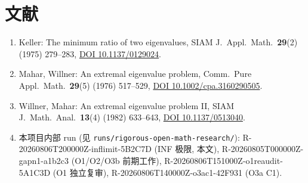 \documentclass[UTF8]{ctexart}
\begin{document}
\section{文献}
\sloppy
\begin{enumerate}
\raggedright
	\item Keller: The minimum ratio of two eigenvalues, SIAM J.\ Appl.\ Math.\
		\textbf{29}(2) (1975) 279--283,
		\href{https://doi.org/10.1137/0129024}{DOI 10.1137/0129024}.
	\item Mahar, Willner: An extremal eigenvalue problem, Comm.\ Pure Appl.\ Math.\
		\textbf{29}(5) (1976) 517--529,
		\href{https://doi.org/10.1002/cpa.3160290505}{DOI 10.1002/cpa.3160290505}.
	\item Willner, Mahar: An extremal eigenvalue problem II, SIAM J.\ Math.\ Anal.\
		\textbf{13}(4) (1982) 633--643,
		\href{https://doi.org/10.1137/0513040}{DOI 10.1137/0513040}.
	\item 本项目内部 run (见 \texttt{runs/rigorous-open-math-research/}):
		R-20260806T200000Z-inflimit-5B2C7D (INF 极限, 本文),
		R-20260805T000000Z-gapn1-a1b2c3 (O1/O2/O3b 前期工作),
		R-20260806T151000Z-o1reaudit-5A1C3D (O1 独立复审),
		R-20260806T140000Z-o3ac1-42F931 (O3a C1).
\end{enumerate}
\end{document}
